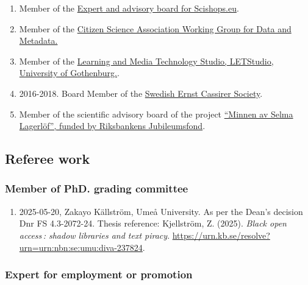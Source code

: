 \documentclass[
]{article}
\providecommand{\tightlist}{%
  \setlength{\itemsep}{0pt}\setlength{\parskip}{0pt}}
\begin{document}
\begin{enumerate}
\def\labelenumi{\arabic{enumi}.}
\tightlist
\item
  Member of the
  \href{https://www.scishops.eu/export-and-advisory-board/\#16}{Expert
  and advisory board for Scishops.eu}.
\item
  Member of the
  \href{https://citizenscienceassociation.org/overview/steering-committees/\#metadata}{Citizen
  Science Association Working Group for Data and Metadata.}
\item
  Member of the
  \href{http://letstudio.gu.se/members/christopher-kullenberg}{Learning
  and Media Technology Studio, LETStudio, University of Gothenburg.}.
\item
  2016-2018. Board Member of the
  \href{http://cassirer.se/sallskapet/styrelse/}{Swedish Ernst Cassirer
  Society}.
\item
  Member of the scientific advisory board of the project
  \href{http://anslag.rj.se/sv/anslag/52553}{``Minnen av Selma
  Lagerlöf'', funded by Riksbankens Jubileumsfond}.
\end{enumerate}

\hypertarget{referee-work}{%
\subsection{Referee work}\label{referee-work}}

\hypertarget{member-of-phd.-grading-committee}{%
\subsubsection{Member of PhD. grading
committee}\label{member-of-phd.-grading-committee}}

\begin{enumerate}
\def\labelenumi{\arabic{enumi}.}
\tightlist
\item
  2025-05-20, Zakayo Källström, Umeå University. As per the Dean's
  decision Dnr FS 4.3-2072-24. Thesis reference: Kjellström, Z. (2025).
  \emph{Black open access\,: shadow libraries and text piracy}.
  \url{https://urn.kb.se/resolve?urn=urn:nbn:se:umu:diva-237824}.
\end{enumerate}

\hypertarget{expert-for-employment-or-promotion}{%
\subsubsection{Expert for employment or
promotion}\label{expert-for-employment-or-promotion}}
\end{document}
